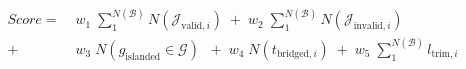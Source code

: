 \begin{equation}
 \begin{aligned}
 Score =  &\; w_1\;  \sum_{1}^{N(\mathcal{B})} N(\mathcal{J}_{\text{valid},i})\; +  \;w_2\; \sum_{1}^{N(\mathcal{B})} N(\mathcal{J}_{\text{invalid},i})\\
		+ &\; w_3\;  N(g_{\text{islanded}} \in \mathcal{G} )\;				 	 \;+  \;w_4\;  N(t_{\text{bridged}, i}) \; +  \;w_5\; \sum_{1}^{N(\mathcal{B})} l_{\text{trim}, i}
 \\
 \end{aligned}
 \label{eq:score}
\end{equation}
